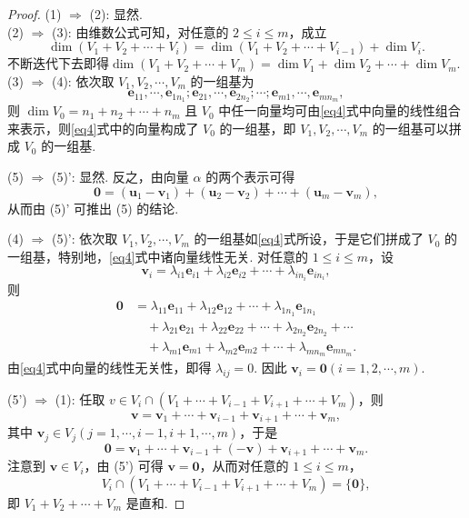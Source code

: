 \documentclass[12pt, a4paper,newtx]{ctexart}
\begin{document}
\begin{proof}
	(1) $\Longrightarrow$ (2): 显然. \\
	(2) $\Longrightarrow$ (3): 由维数公式可知，对任意的 $2 \leqslant i \leqslant m$，成立
	\[
	\dim(V_1 + V_2 + \cdots + V_i) = \dim(V_1 + V_2 + \cdots + V_{i-1}) + \dim V_i.
	\]
	不断迭代下去即得$\dim(V_1 + V_2 + \cdots + V_m) = \dim V_1 + \dim V_2 + \cdots + \dim V_m.$
	(3) $\Longrightarrow$ (4): 依次取 $V_1, V_2, \cdots, V_m$ 的一组基为\begin{equation}\label{eq4}
		\bm e_{11}, \cdots, \bm e_{1n_1}; \bm e_{21}, \cdots, \bm e_{2n_2}; \cdots; \bm e_{m1}, \cdots, \bm e_{mn_m}, 
	\end{equation}
	则 $\dim V_0 = n_1 + n_2 + \cdots + n_m$ 且 $V_0$ 中任一向量均可由\eqref{eq4}式中向量的线性组合来表示，则\eqref{eq4}式中的向量构成了 $V_0$ 的一组基，即 $V_1, V_2, \cdots, V_m$ 的一组基可以拼成 $V_0$ 的一组基. 
	
	(5) $\Longrightarrow$ (5)': 显然. 反之，由向量 $\alpha$ 的两个表示可得
	\[
	\bm 0 = (\bm u_1 - \bm v_1) + (\bm u_2 - \bm v_2) + \cdots + (\bm u_m - \bm v_m),
	\]
	从而由 (5)' 可推出 (5) 的结论. 
	
	(4) $\Longrightarrow$ (5)': 依次取 $V_1, V_2, \cdots, V_m$ 的一组基如\eqref{eq4}式所设，于是它们拼成了 $V_0$ 的一组基，特别地，\eqref{eq4}式中诸向量线性无关. 对任意的 $1 \leqslant i \leqslant m$，设
	\[
	\bm v_i = \lambda_{i1}\bm e_{i1} + \lambda_{i2}\bm e_{i2} + \cdots + \lambda_{in_i}\bm e_{in_i},
	\]
	则\begin{align*}
		\bm 0&=\lambda_{11} \bm e_{11} + \lambda_{12}\bm e_{12} + \cdots + \lambda_{1n_1} \bm e_{1n_1}\\&\quad+ \lambda_{21} \bm e_{21} + \lambda_{22} \bm e_{22} + \cdots + \lambda_{2n_2} \bm e_{2n_2} + \cdots\\&\quad+ \lambda_{m1} \bm e_{m1} + \lambda_{m2} \bm e_{m2} + \cdots + \lambda_{mn_m} \bm e_{mn_m}.
	\end{align*}
	由\eqref{eq4}式中向量的线性无关性，即得 $\lambda_{ij} = 0$. 因此 $\bm v_i =\bm 0 (i = 1, 2, \cdots, m)$. 
	
	(5') $\Longrightarrow$ (1): 任取 $v \in V_i \cap (V_1 + \cdots + V_{i-1} + V_{i+1} + \cdots + V_m)$，则
	\[
	\bm v = \bm v_1 + \cdots + \bm v_{i-1} + \bm v_{i+1} + \cdots + \bm v_m,
	\]
	其中 $\bm v_j \in V_j (j = 1, \cdots, i-1, i+1, \cdots, m)$，于是
	\[
	\bm 0 = \bm v_1 + \cdots + \bm v_{i-1} + (-\bm v) + \bm v_{i+1} + \cdots +\bm v_m.
	\]
	注意到 $\bm v \in V_i$，由 (5') 可得 $\bm v = \bm 0$，从而对任意的 $1 \leqslant i \leqslant m$，
	\[
	V_i \cap (V_1 + \cdots + V_{i-1} + V_{i+1} + \cdots + V_m) = \{\bm 0\},
	\]
	即 $V_1 + V_2 + \cdots + V_m$ 是直和. 
\end{proof}
\end{document}
